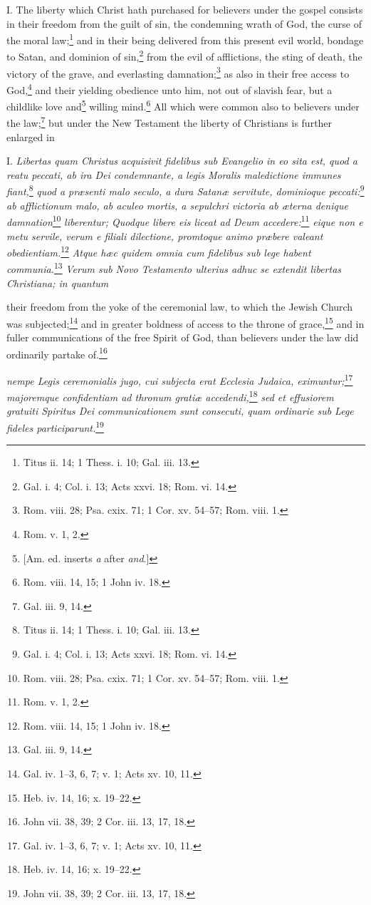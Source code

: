 
I. The liberty which Christ hath purchased for believers under the gospel consists in their freedom from the guilt of sin, the condemning wrath of God, the curse of the moral law;\footnote{Titus ii. 14; 1 Thess. i. 10; Gal. iii. 13.} and in their being delivered from this present evil world, bondage to Satan, and dominion of sin,\footnote{Gal. i. 4; Col. i. 13; Acts xxvi. 18; Rom. vi. 14.} from the evil of afflictions, the sting of death, the victory of the grave, and everlasting damnation;\footnote{Rom. viii. 28; Psa. cxix. 71; 1 Cor. xv. 54–57; Rom. viii. 1.} as also in their free access to God,\footnote{Rom. v. 1, 2.} and their yielding obedience unto him, not out of slavish fear, but a childlike love and\footnote{[Am. ed. inserts \emph{a} after \emph{and}.]} willing mind.\footnote{Rom. viii. 14, 15; 1 John iv. 18.} All which were common also to believers under the law;\footnote{Gal. iii. 9, 14.} but under the New Testament the liberty of Christians is further enlarged in

I. \emph{Libertas quam Christus acquisivit fidelibus sub Evangelio in eo sita est, quod a reatu peccati, ab ira Dei condemnante, a legis Moralis maledictione immunes fiant,}\footnote{Titus ii. 14; 1 Thess. i. 10; Gal. iii. 13.}\emph{ quod a præsenti malo seculo, a dura Satanæ servitute, dominioque peccati:}\footnote{Gal. i. 4; Col. i. 13; Acts xxvi. 18; Rom. vi. 14.}\emph{ ab afflictionum malo, ab aculeo mortis, a sepulchri victoria ab æterna denique damnation}\footnote{Rom. viii. 28; Psa. cxix. 71; 1 Cor. xv. 54–57; Rom. viii. 1.}\emph{ liberentur; Quodque libere eis liceat ad Deum accedere:}\footnote{Rom. v. 1, 2.}\emph{ eique non e metu servile, verum e filiali dilectione, promtoque animo præbere valeant obedientiam.}\footnote{Rom. viii. 14, 15; 1 John iv. 18.}\emph{ Atque hæc quidem omnia cum fidelibus sub lege habent communia.}\footnote{Gal. iii. 9, 14.}\emph{ Verum sub Novo Testamento ulterius adhuc se extendit libertas Christiana; in quantum }

their freedom from the yoke of the ceremonial law, to which the Jewish Church was subjected;\footnote{Gal. iv. 1–3, 6, 7; v. 1; Acts xv. 10, 11.} and in greater boldness of access to the throne of grace,\footnote{Heb. iv. 14, 16; x. 19–22.} and in fuller communications of the free Spirit of God, than believers under the law did ordinarily partake of.\footnote{John vii. 38, 39; 2 Cor. iii. 13, 17, 18.}

\emph{nempe Legis ceremonialis jugo, cui subjecta erat Ecclesia Judaica, eximuntur;}\footnote{Gal. iv. 1–3, 6, 7; v. 1; Acts xv. 10, 11.}\emph{ majoremque confidentiam ad thronum gratiæ accedendi,}\footnote{Heb. iv. 14, 16; x. 19–22.}\emph{ sed et effusiorem gratuiti Spiritus Dei communicationem sunt consecuti, quam ordinarie sub Lege fideles participarunt.}\footnote{John vii. 38, 39; 2 Cor. iii. 13, 17, 18.}

